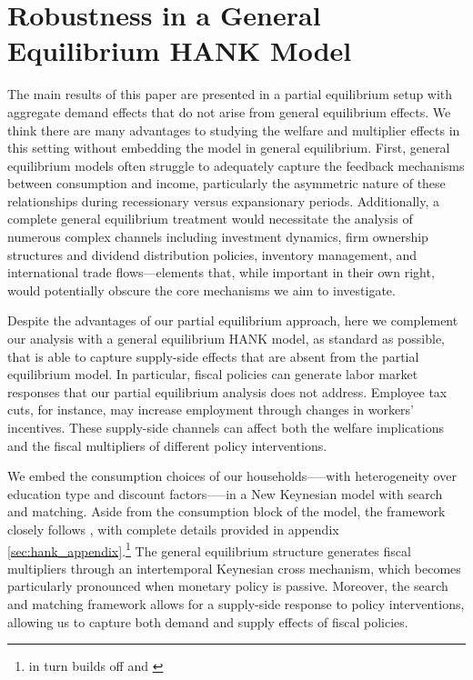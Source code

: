 \documentclass[\econtexRoot/HAFiscal]{subfiles}
\begin{document}
	
\FloatBarrier
\hypertarget{hank}{}\par\section{Robustness in a General Equilibrium HANK Model}
\notinsubfile{\label{sec:hank}}


The main results of this paper are presented in a partial equilibrium setup with aggregate demand effects that do not arise from general equilibrium effects. We think there are many advantages to studying the welfare and multiplier effects in this setting without embedding the model in general equilibrium.  First, general equilibrium models often struggle to adequately capture the feedback mechanisms between consumption and income, particularly the asymmetric nature of these relationships during recessionary versus expansionary periods. Additionally, a complete general equilibrium treatment would necessitate the analysis of numerous complex channels including investment dynamics, firm ownership structures and dividend distribution policies, inventory management, and international trade flows—elements that, while important in their own right, would potentially obscure the core mechanisms we aim to investigate.



Despite the advantages of our partial equilibrium approach, here we complement our analysis with a  general equilibrium HANK model, as standard as possible, that is able to capture supply-side effects that are absent from the partial equilibrium model. In particular, fiscal policies can generate labor market responses that our partial equilibrium analysis does not address. Employee tax cuts, for instance, may increase employment through changes in workers' incentives. These supply-side channels can affect both the welfare implications and the fiscal multipliers of different policy interventions.



We embed the consumption choices of our households—--with heterogeneity over education type and discount factors—--in a New Keynesian model with search and matching. Aside from the consumption block of the model, the framework closely follows \cite{Du2024}, with complete details provided in appendix \ref{sec:hank_appendix}.\footnote{\cite{Du2024} in turn builds off \cite{Gornemann2021} and \cite{Auclert2020}} The general equilibrium structure generates fiscal multipliers through an intertemporal Keynesian cross mechanism, which becomes particularly pronounced when monetary policy is passive. Moreover, the search and matching framework allows for a supply-side response to policy interventions, allowing us to capture both demand and supply effects of fiscal policies.
\end{document}
